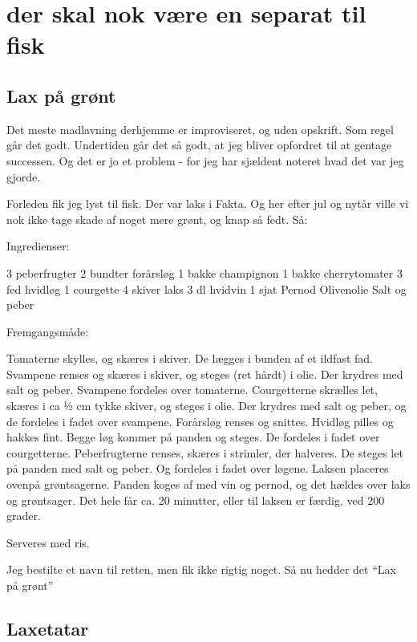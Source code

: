 \documentclass[
]{book}
\begin{document}
\chapter{der skal nok være en separat til fisk}\label{der-skal-nok-vuxe6re-en-separat-til-fisk}

\section{Lax på grønt}\label{lax-puxe5-gruxf8nt}

Det meste madlavning derhjemme er improviseret, og uden opskrift. Som regel går det godt. Undertiden går det så godt, at jeg bliver opfordret til at gentage successen. Og det er jo et problem - for jeg har sjældent noteret hvad det var jeg gjorde.

Forleden fik jeg lyst til fisk. Der var laks i Fakta. Og her efter jul og nytår ville vi nok ikke tage skade af noget mere grønt, og knap så fedt. Så:

Ingredienser:

3 peberfrugter
2 bundter forårsløg
1 bakke champignon
1 bakke cherrytomater
3 fed hvidløg
1 courgette
4 skiver laks
3 dl hvidvin
1 sjat Pernod
Olivenolie
Salt og peber

Fremgangsmåde:

Tomaterne skylles, og skæres i skiver. De lægges i bunden af et ildfast fad.
Svampene renses og skæres i skiver, og steges (ret hårdt) i olie. Der krydres med salt og peber.
Svampene fordeles over tomaterne.
Courgetterne skrælles let, skæres i ca ½ cm tykke skiver, og steges i olie. Der krydres med salt og peber, og de fordeles i fadet over svampene.
Forårsløg renses og snittes.
Hvidløg pilles og hakkes fint.
Begge løg kommer på panden og steges. De fordeles i fadet over courgetterne.
Peberfrugterne renses, skæres i strimler, der halveres. De steges let på panden med salt og peber. Og fordeles i fadet over løgene.
Laksen placeres ovenpå grøntsagerne.
Panden koges af med vin og pernod, og det hældes over laks og grøntsager.
Det hele får ca. 20 minutter, eller til laksen er færdig, ved 200 grader.

Serveres med ris.

Jeg bestilte et navn til retten, men fik ikke rigtig noget. Så nu hedder det ``Lax på grønt''

\section{Laxetatar}\label{laxetatar}
\end{document}
